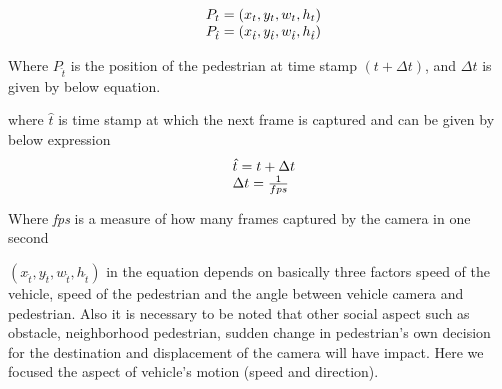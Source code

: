 \begin{equation}
\begin{array}{l@{}}
{P}_{t}=(x_t,y_t,w_t,h_t) \\
{P}_{\hat{t}}=(x_{\hat{t}},y_{\hat{t}},w_{\hat{t}},h_{\hat{t}})
\end{array}
\end{equation}

Where ${P}_{\hat{t}}$ is the position of the pedestrian at time stamp $(t+\Delta t)$, and $\Delta t$ is given by below equation.

where $\hat{t}$ is time stamp at which the next frame is captured and can be given by below expression
\begin{equation} \label{delta-t}
\begin{array}{l@{}}
\hat{t} = t +  \Delta t \\
\Delta t = \frac{1}{fps}
\end{array}
\end{equation}


Where \textit{fps} is a measure of how many frames captured by the camera in one second

$(x_{\hat{t}},y_{\hat{t}},w_{\hat{t}},h_{\hat{t}})$ in the equation depends on basically three factors speed of the vehicle, speed of the pedestrian and the angle between vehicle camera and pedestrian. Also it is necessary to be noted that other social aspect such as obstacle, neighborhood pedestrian, sudden change in pedestrian's own decision for the destination and displacement of the camera will have impact.
Here we focused the aspect of vehicle's motion (speed and direction).








